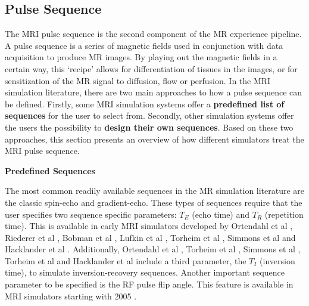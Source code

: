 \subsection{Pulse Sequence}

The MRI pulse sequence is the second component of the MR experience pipeline.
A pulse sequence is a series of magnetic fields used in conjunction with data acquisition to produce MR images. 
By playing out the magnetic fields in a certain way, this `recipe' allows for differentiation of tissues in the images, or for sensitization of the MR signal to diffusion, flow or perfusion.
In the MRI simulation literature, there are two main approaches to how a pulse sequence can be defined.
Firstly, some MRI simulation systems offer a \textbf{predefined list of sequences} for the user to select from.
Secondly, other simulation systems offer the users the possibility to \textbf{design their own sequences}.
Based on these two approaches, this section presents an overview of how different simulators treat the MRI pulse sequence.

\hfill

\large \textbf{Predefined Sequences} \normalsize

The most common readily available sequences in the MR simulation literature are the classic spin-echo and gradient-echo.
These types of sequences require that the user specifies two sequence specific parameters: $T_E$ (echo time) and $T_R$ (repetition time).
This is available in early MRI simulators developed by Ortendahl et al \cite{Ortendahl1984}, Riederer et al \cite{Riederer1984}, Bobman et al \cite{Bobman1985}, Lufkin et al \cite{Lufkin1986}, Torheim et al \cite{Torheim1994}, Simmons et al \cite{Simmons1996} and Hacklander et al \cite{Hacklander2005}.
Additionally, Ortendahl et al \cite{Ortendahl1984}, Torheim et al \cite{Torheim1994}, Simmons et al \cite{Simmons1996}, Torheim et al \cite{Torheim1994} and Hacklander et al \cite{Hacklander2005} include a third parameter, the $T_I$ (inversion time), to simulate inversion-recovery sequences.
Another important sequence parameter to be specified is the RF pulse flip angle. 
This feature is available in MRI simulators starting with 2005 \cite{Benoit-Cattin2005}.


